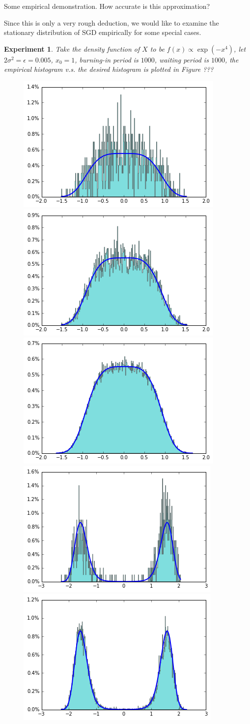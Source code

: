 \documentclass[preprint,12pt,3p]{elsarticle}
\newtheorem{experiment}{Experiment}
\begin{document}
Some empirical demonstration. How accurate is this approximation?

Since this is only a very rough deduction, we would like to examine the stationary distribution of SGD empirically for some special cases.

\begin{experiment}
Take the density function of $X$ to be $f(x) \propto \exp(- x^4)$, let $2\sigma^2 = \epsilon = 0.005$, $x_0 = 1$, burning-in period is $1000$, waiting period is $1000$, the empirical histogram v.s. the desired histogram is plotted in Figure ???
\end{experiment}
\begin{figure}
    \centering
    \includegraphics[width=.3\textwidth]{../figure/case1_step_0.005_iter_1e3.png}
    \includegraphics[width=.3\textwidth]{../figure/case1_step_0.005_iter_1e4.png}
    \includegraphics[width=.3\textwidth]{../figure/case1_step_0.005_iter_1e5.png}
    \includegraphics[width=.3\textwidth]{../figure/case2_step_0.005_iter_1e3.png}
    \includegraphics[width=.3\textwidth]{../figure/case2_step_0.005_iter_1e4.png}

\end{figure}
\end{document}
